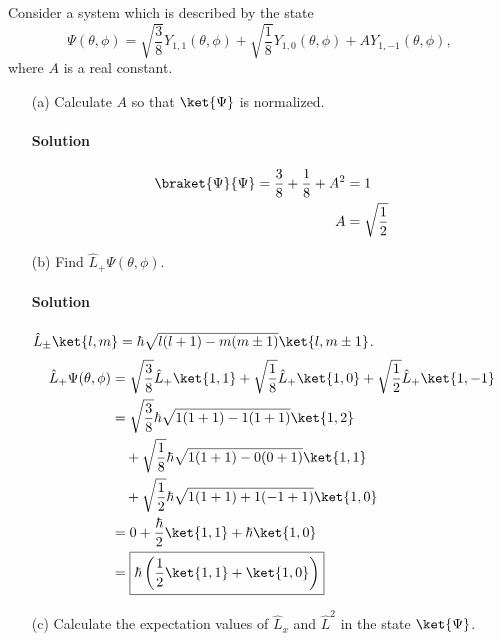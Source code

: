 \documentclass{article}
\begin{document}
	Consider a system which is described by the state
	\begin{equation} \label{eq:2}
		\Psi(\theta, \phi) = \sqrt{\frac{3}{8}} Y_{1,1}(\theta, \phi) + \sqrt{\frac{1}{8}} Y_{1,0}(\theta, \phi) + A Y_{1,-1}(\theta, \phi), 
	\end{equation}
	where $A$ is a real constant.
	\begin{enumerate}
		\item[(a)] Calculate $A$ so that $\ket{\Psi}$ is normalized.
		\paragraph{Solution}
		\begin{equation}
			\begin{aligned}[b]
				\braket{\Psi}{\Psi} = \frac{3}{8} + \frac{1}{8} + A^2 &= 1 \\
																	A &= \sqrt{\frac{1}{2}}
			\end{aligned}
		\end{equation}
		
		\item[(b)] Find $\hat{L}_+ \Psi(\theta, \phi)$.
		\paragraph{Solution} $\hat{L}_{\pm}\ket{l,m} = \hbar \sqrt{l(l+1)-m(m \pm 1)} \ket{l,m \pm 1}$.
		\begin{equation}
			\begin{aligned}[b]
				\hat{L}_+ \Psi(\theta, \phi) &= \sqrt{\frac{3}{8}} \hat{L}_+ \ket{1,1} + \sqrt{\frac{1}{8}} \hat{L}_+ \ket{1,0} + \sqrt{\frac{1}{2}} \hat{L}_+ \ket{1,-1} \\
											 &= \sqrt{\frac{3}{8}} \hbar \sqrt{ 1(1+1) - 1(1+1) } \ket{1,2} \\
											 &\quad + \sqrt{\frac{1}{8}} \hbar \sqrt{ 1(1+1) - 0(0+1) } \ket{1,1} \\
											 &\quad + \sqrt{\frac{1}{2}} \hbar \sqrt{ 1(1+1) + 1(-1+1) } \ket{1,0} \\
											 &= 0 + \frac{\hbar}{2} \ket{1,1} + \hbar \ket{1,0} \\
											 &= \boxed{\hbar \left(\frac{1}{2} \ket{1,1} + \ket{1,0}\right)}
			\end{aligned}
		\end{equation}
		
		\item[(c)] Calculate the expectation values of $\hat{L}_x$ and $\hat{L}^2$ in the state $\ket{\Psi}$.

\end{enumerate}
\end{document}
